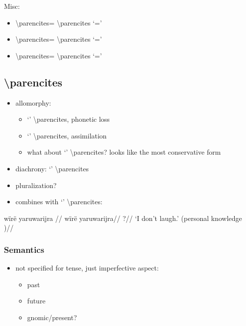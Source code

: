 \documentclass{memoir}
\begin{document}
Misc:

\begin{itemize}
\tightlist
\item
   \textbackslash parencites=
  \textbackslash parencites `='
\item
   \textbackslash parencites=
  \textbackslash parencites `='
\item
   \textbackslash parencites=
  \textbackslash parencites `='
\end{itemize}

\subsection{\texorpdfstring{ \textbackslash parencites
\label{sec:riipfv}}{ \textbackslash parencites }}

\begin{itemize}
\tightlist
\item
  allomorphy:

  \begin{itemize}
  \tightlist
  \item
     `' \textbackslash parencites, phonetic loss
  \item
     `' \textbackslash parencites, assimilation
  \item
    what about  `' \textbackslash parencites? looks
    like the most conservative form
  \end{itemize}
\item
  diachrony:  `' \textbackslash parencites
\item
  pluralization?
\item
  combines with  `' \textbackslash parencites:
\end{itemize}

\ex \label{convrisamaj-4}
\begingl \glpreamble wïrë yaruwarijra //
\gla wïrë yaruwarijra//
\glb {} ?//
\glft ‘I don’t laugh.’ (personal knowledge
)//
\endgl
\xe

\subsubsection{Semantics}

\begin{itemize}
\tightlist
\item
  not specified for tense, just imperfective aspect:

  \begin{itemize}
  \tightlist
  \item
    past 
  \item
    future 
  \item
    gnomic/present? 
  \end{itemize}
\end{itemize}
\end{document}
